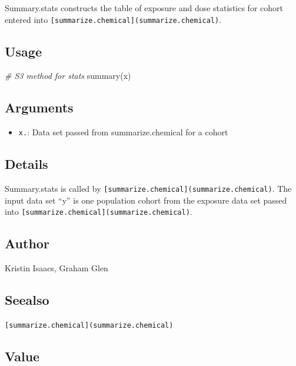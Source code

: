 \documentclass[
]{article}
\newenvironment{Shaded}{\begin{snugshade}}{\end{snugshade}}
\newcommand{\CommentTok}[1]{\textcolor[rgb]{0.56,0.35,0.01}{\textit{#1}}}
\newcommand{\FunctionTok}[1]{\textcolor[rgb]{0.00,0.00,0.00}{#1}}
\newcommand{\NormalTok}[1]{#1}
\providecommand{\tightlist}{%
  \setlength{\itemsep}{0pt}\setlength{\parskip}{0pt}}
\begin{document}
Summary.stats constructs the table of exposure and dose statistics for
cohort entered into
\texttt{{[}summarize.chemical{]}(summarize.chemical)}.

\hypertarget{usage-53}{%
\subsection{Usage}\label{usage-53}}

\begin{Shaded}
\begin{Highlighting}[]
\CommentTok{\# S3 method for stats}
\FunctionTok{summary}\NormalTok{(x)}
\end{Highlighting}
\end{Shaded}

\hypertarget{arguments-38}{%
\subsection{Arguments}\label{arguments-38}}

\begin{itemize}
\tightlist
\item
  \texttt{x.}: Data set passed from summarize.chemical for a cohort
\end{itemize}

\hypertarget{details-30}{%
\subsection{Details}\label{details-30}}

Summary.stats is called by
\texttt{{[}summarize.chemical{]}(summarize.chemical)}. The input data
set ``y'' is one population cohort from the exposure data set passed
into \texttt{{[}summarize.chemical{]}(summarize.chemical)}.

\hypertarget{author-33}{%
\subsection{Author}\label{author-33}}

Kristin Isaacs, Graham Glen

\hypertarget{seealso-25}{%
\subsection{Seealso}\label{seealso-25}}

\texttt{{[}summarize.chemical{]}(summarize.chemical)}

\hypertarget{value-36}{%
\subsection{Value}\label{value-36}}
\end{document}
